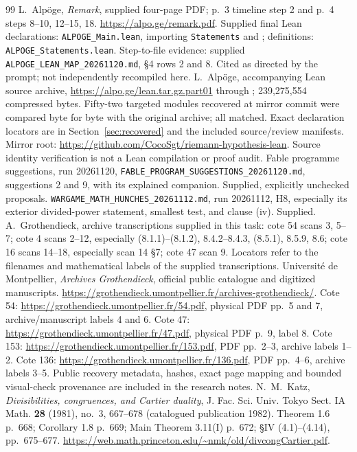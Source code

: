 \documentclass[11pt,a4paper]{article}
\theoremstyle{definition}\newtheorem{remark}[theorem]{Remark}
\begin{document}
\begin{thebibliography}{99}
 L.~Alp\"oge, \emph{Remark}, supplied four-page PDF; p.~3 timeline step 2 and p.~4 steps 8--10, 12--15, 18. \url{https://alpo.ge/remark.pdf}. Supplied final Lean declarations: \texttt{ALPOGE\_Main.lean}, importing \texttt{Statements} and ; definitions: \texttt{ALPOGE\_Statements.lean}. Step-to-file evidence: supplied \texttt{ALPOGE\_LEAN\_MAP\_20261120.md}, \S4 rows 2 and 8. Cited as directed by the prompt; not independently recompiled here.
 L.~Alp\"oge, accompanying Lean source archive, \url{https://alpo.ge/lean.tar.gz.part01} through ; 239,275,554 compressed bytes. Fifty-two targeted modules recovered at mirror commit  were compared byte for byte with the original archive; all matched. Exact declaration locators are in Section~\ref{sec:recovered} and the included source/review manifests. Mirror root: \url{https://github.com/CocoSgt/riemann-hypothesis-lean}. Source identity verification is not a Lean compilation or proof audit.
 Fable programme suggestions, run 20261120, \texttt{FABLE\_PROGRAM\_SUGGESTIONS\_20261120.md}, suggestions 2 and 9, with its explained companion. Supplied, explicitly unchecked proposals.
 \texttt{WARGAME\_MATH\_HUNCHES\_20261112.md}, run 20261112, H8, especially its exterior divided-power statement, smallest test, and clause (iv). Supplied.
 A.~Grothendieck, archive transcriptions supplied in this task: cote 54 scans 3, 5--7; cote 4 scans 2--12, especially (8.1.1)--(8.1.2), 8.4.2--8.4.3, (8.5.1), 8.5.9, 8.6; cote 16 scans 14--18, especially scan 14 \S7; cote 47 scan 9. Locators refer to the filenames and mathematical labels of the supplied transcriptions.
 Universit\'e de Montpellier, \emph{Archives Grothendieck}, official public catalogue and digitized manuscripts. \url{https://grothendieck.umontpellier.fr/archives-grothendieck/}. Cote 54: \url{https://grothendieck.umontpellier.fr/54.pdf}, physical PDF pp.~5 and 7, archive/manuscript labels 4 and 6. Cote 47: \url{https://grothendieck.umontpellier.fr/47.pdf}, physical PDF p.~9, label 8. Cote 153: \url{https://grothendieck.umontpellier.fr/153.pdf}, PDF pp.~2--3, archive labels 1--2. Cote 136: \url{https://grothendieck.umontpellier.fr/136.pdf}, PDF pp.~4--6, archive labels 3--5. Public recovery metadata, hashes, exact page mapping and bounded visual-check provenance are included in the research notes.
 N.~M.~Katz, \emph{Divisibilities, congruences, and Cartier duality}, J. Fac. Sci. Univ. Tokyo Sect. IA Math. \textbf{28} (1981), no.~3, 667--678 (catalogued publication 1982). Theorem 1.6 p.~668; Corollary 1.8 p.~669; Main Theorem 3.11(I) p.~672; \S IV (4.1)--(4.14), pp.~675--677. \url{https://web.math.princeton.edu/~nmk/old/divcongCartier.pdf}.

\end{thebibliography}
\end{document}
